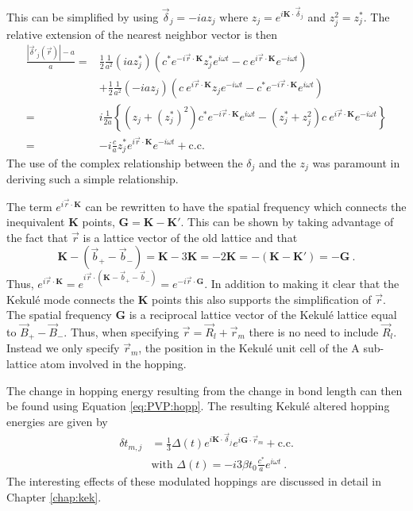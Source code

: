 This can be simplified by using $\vec{\delta}_j=-i a z_j$ where $z_j= e^{i \bm{K} \cdot \vec{\delta}_j}$ and $z_j^2=z_j^*$.
The relative extension of the nearest neighbor vector is then
\begin{align*}
	\frac{|\vec{\delta}'_j(\vec{r})|-a}{a}=&
		\frac{1}{2} \frac{1}{a^2} (i a z_j^*) 
		\left( c^* e^{-i\vec{r} \cdot \bm{K}} z_j^* e^{i \omega t} - c \ e^{i\vec{r} \cdot \bm{K}} e^{-i \omega t} \right) \\
	&+\frac{1}{2}\frac{1}{a^2} (-ia z_j)
		\left( c \ e^{i\vec{r} \cdot \bm{K}} z_j e^{-i \omega t} - c^* e^{-i\vec{r} \cdot \bm{K}} e^{i \omega t} \right) \\
	=&i \frac{1}{2a} \left\{
		(z_j+(z_j^*)^2) c^* e^{-i\vec{r} \cdot \bm{K}} e^{i \omega t}
		-(z_j^*+z_j^2)c \ e^{i\vec{r} \cdot \bm{K}} e^{-i \omega t}
		\right\} \\
	=&-i \frac{c}{a} z_j^* e^{i\vec{r} \cdot \bm{K}} e^{-i \omega t} + \text{c.c.}
\end{align*}
The use of the complex relationship between the $\delta_j$ and the $z_j$ was paramount in deriving such a simple relationship.

The term $e^{i \vec{r} \cdot \bm{K}}$ can be rewritten to have the spatial frequency which connects the inequivalent $\bm{K}$ points, $\bm{G}=\bm{K}-\bm{K'}$.
This can be shown by taking advantage of the fact that $\vec{r}$ is a lattice vector of the old lattice and that
\begin{equation*}
	\bm{K}-(\vec{b}_+-\vec{b}_-)=\bm{K}-3 \bm{K}=-2 \bm{K}=-(\bm{K}-\bm{K'})=-\bm{G} \ .
\end{equation*} 
Thus, $e^{i \vec{r}\cdot \bm{K}}=e^{i\vec{r}\cdot(\bm{K} - \vec{b}_+-\vec{b}_-)}= e^{-i \vec{r} \cdot \bm{G}}$.
In addition to making it clear that the Kekul\'e mode connects the $\bm{K}$ points this also supports the simplification of $\vec{r}$.
The spatial frequency $\bm{G}$ is a reciprocal lattice vector of the Kekul\'e lattice equal to $\vec{B}_+ - \vec{B}_-$.
Thus, when specifying $\vec{r}=\vec{R}_l+\vec{r}_m$ there is no need to include $\vec{R}_l$.
Instead we only specify $\vec{r}_m$, the position in the Kekul\'e unit cell of the A sub-lattice atom involved in the hopping.

The change in hopping energy resulting from the change in bond length can then be found using Equation \ref{eq:PVP:hopp}.
The resulting Kekul\'e altered hopping energies are given by
\begin{align*}
	\delta t_{m,j}&=\frac{1}{3} \Delta(t) e^{i \bm{K} \cdot \vec{\delta}_j} e^{i \bm{G} \cdot \vec{r}_m}+\text{c.c.} \nonumber \\
	& \text{with } \Delta(t)=-i 3 \beta t_0 \frac{c^*}{a} e^{i \omega t} \ .
\end{align*}
The interesting effects of these modulated hoppings are discussed in detail in Chapter \ref{chap:kek}.